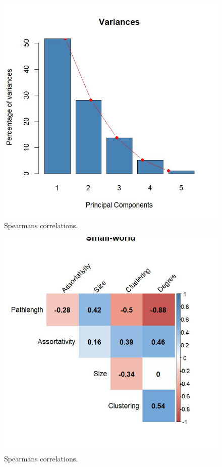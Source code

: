 \documentclass[
]{article}
\begin{document}
\begin{figure}[!H]

{\centering \includegraphics{./Figures/unnamed-chunk-79-1} 

}

\caption{Spearmans correlations.}\label{fig:unnamed-chunk-79-1}
\end{figure}
\begin{figure}[!H]

{\centering \includegraphics{./Figures/unnamed-chunk-79-2} 

}

\caption{Spearmans correlations.}\label{fig:unnamed-chunk-79-2}
\end{figure}
\end{document}
